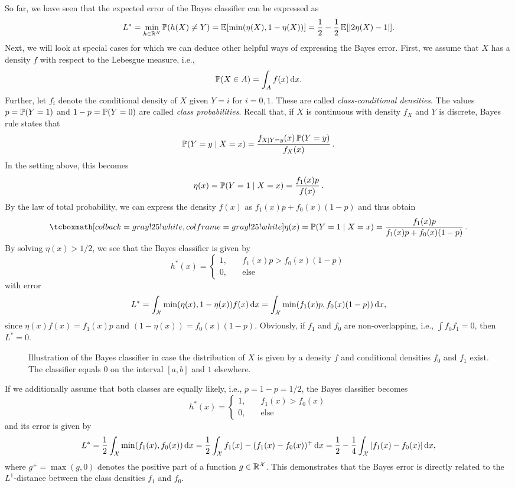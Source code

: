 So far, we have seen that the expected error of the Bayes classifier can be expressed as
\[
    L^* = \min_{h \in \mathbb{R}^{\mathcal{X}}} \operatorname{\mathbb{P}}(h(X) \neq Y) = \operatorname{\mathbb{E}}[\min(\eta(X), 1 - \eta(X))] = \frac{1}{2} - \frac{1}{2} \operatorname{\mathbb{E}}[\abs{2\eta(X) - 1}].
\]
Next, we will look at special cases for which we can deduce other helpful ways of expressing the Bayes error. First, we assume that $X$ has a density $f$ with respect to the Lebesgue measure, i.e.,
\[
    \operatorname{\mathbb{P}}(X \in A) = \int_{A} f(x) \, \mathrm{d}x.
\]
Further, let $f_i$ denote the conditional density of $X$ given $Y = i$ for $i = 0, 1$. These are called \emph{class-conditional densities}. The values $p = \operatorname{\mathbb{P}}(Y = 1)$ and $1 - p = \operatorname{\mathbb{P}}(Y = 0)$ are called \emph{class probabilities}. Recall that, if $X$ is continuous with density $f_X$ and $Y$ is discrete, Bayes rule states that
\[
    \operatorname{\mathbb{P}}(Y = y \mathrel{|} X = x) = \frac{f_{X \mathrel{|} Y = y}(x) \operatorname{\mathbb{P}}(Y = y)}{f_X(x)} \, .
\]
In the setting above, this becomes
\[
    \eta(x) = \operatorname{\mathbb{P}}(Y = 1 \mathrel{|} X = x) = \frac{f_1(x) p}{f(x)} \, .
\]
By the law of total probability, we can express the density $f(x)$ as $f_1(x)p + f_0(x)(1 - p)$ and thus obtain
\begin{equation}
    \highlightMath{
        \eta(x) = \Prob(Y = 1 \given X = x) = \frac{f_1(x) p}{f_1(x)p + f_0(x)(1 - p)} \, .
    }
\end{equation}
By solving $\eta(x) > 1/2$, we see that the Bayes classifier is given by
\begin{equation}
\label{eq: bayes classifier for X with density}
    h^*(x) = \begin{cases}
        1, \quad & f_1(x)p > f_0(x)(1 - p) \\
        0, \quad & \text{else}
    \end{cases}
\end{equation}
with error
\[
    L^* = \int_{\mathcal{X}} \min(\eta(x), 1 - \eta(x)) f(x) \, \mathrm{d}x = \int_{\mathcal{X}} \min(f_1(x)p, f_0(x)(1 - p)) \, \mathrm{d}x,
\]
since $\eta(x)f(x) = f_1(x)p$ and $(1 - \eta(x)) = f_0(x)(1 - p)$. Obviously, if $f_1$ and $f_0$ are non-overlapping, i.e., $\int f_0 f_1 = 0$, then $L^* = 0$.
\begin{figure}
    \centering
    \resizebox{9cm}{!}{}
    \caption{%
        Illustration of the Bayes classifier in case the distribution of $X$ is given by a density $f$ and conditional densities $f_0$ and $f_1$ exist. The classifier equals $0$ on the interval $[a, b]$ and $1$ elsewhere.
    }
\end{figure}
If we additionally assume that both classes are equally likely, i.e., $p = 1 - p = 1/2$, the Bayes classifier becomes
\[
    h^*(x) = \begin{cases}
        1, \quad & f_1(x) > f_0(x) \\
        0, \quad & \text{else}
    \end{cases}
\]
and its error is given by
\[
    L^* = \frac{1}{2} \int_{\mathcal{X}} \min(f_1(x), f_0(x)) \, \mathrm{d}x = \frac{1}{2} \int_{\mathcal{X}} f_1(x) - (f_1(x) - f_0(x))^{+} \, \mathrm{d}x = \frac{1}{2} - \frac{1}{4} \int_{\mathcal{X}} \abs{f_1(x) - f_0(x)} \, \mathrm{d}x,
\]
where $g^{+} = \max(g, 0)$ denotes the positive part of a function $g \in \mathbb{R}^{\mathcal{X}}$. This demonstrates that the Bayes error is directly related to the $L^1$-distance between the class densities $f_1$ and $f_0$.
